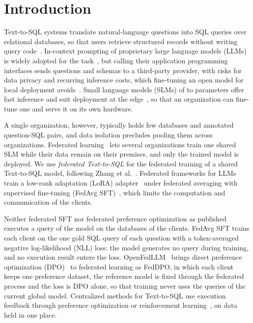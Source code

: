 \section{Introduction}\label{sec:intro}

Text-to-SQL systems translate natural-language questions into SQL
queries over relational databases, so that users retrieve structured
records without writing query code~\cite{yu2018spider,li2023bird}.
In-context prompting of proprietary large language models (LLMs) is
widely adopted for the task~\cite{pourreza2023dinsql,gao2024dailsql}, but
calling their application programming interfaces sends questions and
schemas to a third-party provider, with risks for data privacy and
recurring inference costs, which fine-tuning an open model for local
deployment avoids~\cite{li2024codes}. Small language models (SLMs) of
 to  parameters offer fast
inference and suit deployment at the edge~\cite{sheng2025slmsql}, so that
an organization can fine-tune one and serve it on its own hardware.

A single organization, however, typically holds few databases and
annotated question-SQL pairs, and data isolation precludes pooling them
across organizations. Federated learning~\cite{mcmahan2017fedavg} lets
several organizations train one shared SLM while their data remain on
their premises, and only the trained model is deployed. We use
\textit{federated Text-to-SQL} for the federated training of a shared
Text-to-SQL model, following Zhang et al.~\cite{zhang2023fl4sp}.
Federated frameworks for LLMs train a low-rank adaptation (LoRA)
adapter~\cite{hu2022lora} under federated averaging with supervised
fine-tuning (FedAvg SFT)~\cite{mcmahan2017fedavg,ye2024openfedllm}, which
limits the computation and communication of the clients.

Neither federated SFT nor federated preference optimization as published
executes a query of the model on the databases of the clients. FedAvg
SFT trains each client on the one gold SQL query of each question with a
token-averaged negative log-likelihood (NLL) loss: the model generates
no query during training, and no execution result enters the loss.
OpenFedLLM~\cite{ye2024openfedllm} brings direct preference optimization
(DPO)~\cite{rafailov2023dpo} to federated learning as FedDPO, in which
each client keeps one preference dataset, the reference model is fixed
through the federated process and the loss is DPO alone, so that
training never uses the queries of the current global model. Centralized
methods for Text-to-SQL use execution feedback through preference
optimization or reinforcement
learning~\cite{tao2024codelutra,zhai2025excot,papicchio2025think2sql,yao2026arctic},
on data held in one place.

